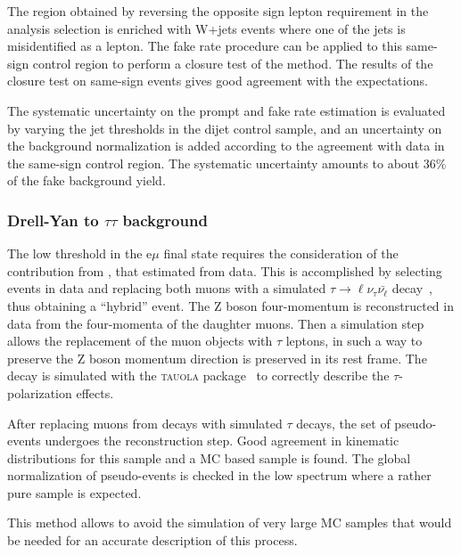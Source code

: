 The region obtained by reversing the opposite sign lepton requirement in the analysis selection 
is enriched with W+jets events where one of the jets is misidentified as a lepton. The fake 
rate procedure can be applied to this same-sign control region to perform a closure test of the
method. 
The results of the closure test on same-sign events gives good agreement with the expectations.

The systematic uncertainty on the prompt and fake rate estimation is evaluated by varying the jet thresholds in the dijet control sample, and an uncertainty on the background normalization is added according to the agreement with data in the same-sign control region. The systematic uncertainty amounts to about 36\% of the fake background yield.










	\subsubsection{Drell-Yan to \texorpdfstring{$\tau\tau$}{tau tau} background\label{sec:DYtautaubkg}}


The low \MET threshold in the e$\mu$ final state
requires the consideration of the contribution from 
\dytt, that estimated from data.
This is accomplished by selecting \dymm events in data and replacing both muons with a simulated
$\tau\to \ell\nu_\tau\bar{\nu_\ell}$ decay~\cite{Chatrchyan:2013iaa}, thus obtaining a ``hybrid'' event. The Z boson four-momentum is reconstructed in data from the four-momenta of the daughter muons. Then a simulation step allows the replacement of the muon objects with $\tau$ leptons, in such a way to preserve the Z boson momentum direction is preserved in its rest frame. The \dytt decay is simulated with the \textsc{tauola} package~\cite{Jadach:1990mz} to correctly describe the $\tau$-polarization effects.

After replacing muons from \dymm decays with simulated $\tau$ decays,
the set of pseudo-\dytt events undergoes the reconstruction step.
Good agreement in kinematic distributions for this sample
and a MC based \dytt sample is found.
The global normalization of pseudo-\dytt events is 
checked in the low \mt spectrum where a rather pure
\dytt sample is expected.

This method allows to avoid the simulation of very large MC samples that would be needed for an accurate description of this process. 











